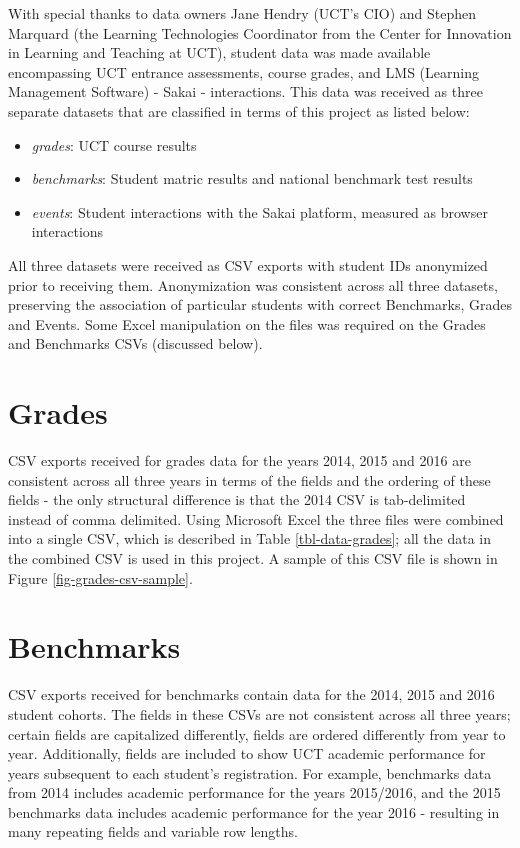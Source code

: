 With special thanks to data owners Jane Hendry (UCT's CIO) and Stephen Marquard (the Learning Technologies Coordinator from the Center for Innovation in Learning and Teaching at UCT), student data was made available encompassing UCT entrance assessments, course grades, and LMS (Learning Management Software) - Sakai \cite{sakai} - interactions. This data was received as three separate datasets that are classified in terms of this project as listed below:

\begin{itemize}
    \item \textit{grades}: UCT course results
    \item \textit{benchmarks}: Student matric results and national benchmark test results
    \item \textit{events}: Student interactions with the Sakai platform, measured as browser interactions
\end{itemize}

All three datasets were received as CSV exports with student IDs anonymized prior to receiving them. Anonymization was consistent across all three datasets, preserving the association of particular students with correct Benchmarks, Grades and Events. Some Excel manipulation on the files was required on the Grades and Benchmarks CSVs (discussed below).

\section{Grades}
CSV exports received for grades data for the years 2014, 2015 and 2016 are consistent across all three years in terms of the fields and the ordering of these fields - the only structural difference is that the 2014 CSV is tab-delimited instead of comma delimited. Using Microsoft Excel the three files were combined into a single CSV, which is described in Table \ref{tbl-data-grades}; all the data in the combined CSV is used in this project. A sample of this CSV file is shown in Figure \ref{fig-grades-csv-sample}.




\section{Benchmarks}
CSV exports received for benchmarks contain data for the 2014, 2015 and 2016 student cohorts. The fields in these CSVs are not consistent across all three years; certain fields are capitalized differently, fields are ordered differently from year to year. Additionally, fields are included to show UCT academic performance for years subsequent to each student's registration. For example, benchmarks data from 2014 includes academic performance for the years 2015/2016, and the 2015 benchmarks data includes academic performance for the year 2016 - resulting in many repeating fields and variable row lengths.

